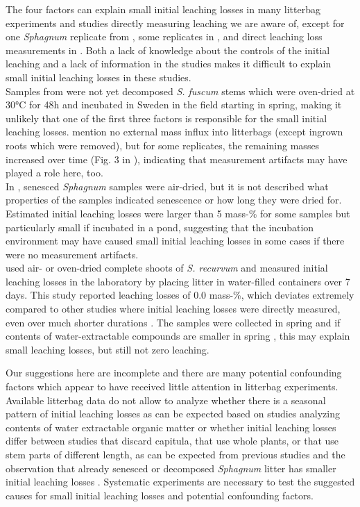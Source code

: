 \documentclass[bg, manuscript]{copernicus}
\begin{document}
The four factors can explain small initial leaching losses in many litterbag experiments and studies directly measuring leaching we are aware of, except for one \emph{Sphagnum} replicate from \citet{Breeuwer.2008}, some replicates in \citet{Moore.2007}, and direct leaching loss measurements in \citet{Coulson.1978}. Both a lack of knowledge about the controls of the initial leaching and a lack of information in the studies makes it difficult to explain small initial leaching losses in these studies.\\
Samples from \citet{Breeuwer.2008} were not yet decomposed \emph{S. fuscum} stems which were oven-dried at 30°C for 48h and incubated in Sweden in the field starting in spring, making it unlikely that one of the first three factors is responsible for the small initial leaching losses. \citet{Breeuwer.2008} mention no external mass influx into litterbags (except ingrown roots which were removed), but for some replicates, the remaining masses increased over time (Fig. 3 in \citet{Breeuwer.2008}), indicating that measurement artifacts may have played a role here, too.\\
In \citet{Moore.2007}, senesced \emph{Sphagnum} samples were air-dried, but it is not described what properties of the samples indicated senescence or how long they were dried for. Estimated initial leaching losses were larger than 5 mass-\% for some samples but particularly small if incubated in a pond, suggesting that the incubation environment may have caused small initial leaching losses in some cases if there were no measurement artifacts.\\
\citet{Coulson.1978} used air- or oven-dried complete shoots of \emph{S. recurvum} and measured initial leaching losses in the laboratory by placing litter in water-filled containers over 7 days. This study reported leaching losses of 0.0 mass-\%, which deviates extremely compared to other studies where initial leaching losses were directly measured, even over much shorter durations \citep{Moore.2001, Castells.2005, Mastny.2018}. The samples were collected in spring and if contents of water-extractable compounds are smaller in spring \citep{Sytiuk.2023}, this may explain small leaching losses, but still not zero leaching.

Our suggestions here are incomplete and there are many potential confounding factors which appear to have received little attention in litterbag experiments. Available litterbag data do not allow to analyze whether there is a seasonal pattern of initial leaching losses as can be expected based on studies analyzing contents of water extractable organic matter \citep{Edwards.2018, Sytiuk.2023} or whether initial leaching losses differ between studies that discard capitula, that use whole plants, or that use stem parts of different length, as can be expected from previous studies and the observation that already senesced or decomposed \emph{Sphagnum} litter has smaller initial leaching losses \citep{Moore.2001}. Systematic experiments are necessary to test the suggested causes for small initial leaching losses and potential confounding factors.
\end{document}
